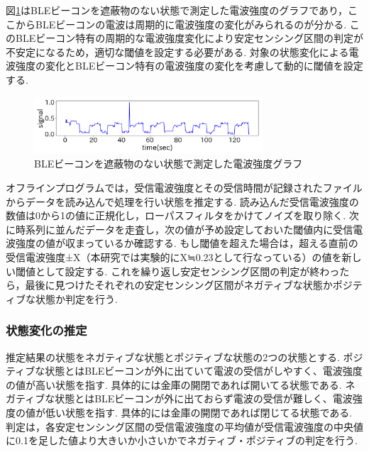 \documentclass[Japanese]{dicomopapers}
\begin{document}
図\ref{nomal-data}はBLEビーコンを遮蔽物のない状態で測定した電波強度のグラフであり，ここからBLEビーコンの電波は周期的に電波強度の変化がみられるのが分かる.
このBLEビーコン特有の周期的な電波強度変化により安定センシング区間の判定が不安定になるため，適切な閾値を設定する必要がある.
対象の状態変化による電波強度の変化とBLEビーコン特有の電波強度の変化を考慮して動的に閾値を設定する.


\begin{figure}[tbh]
    \centering
    \includegraphics[width=8.5cm]{bokoboko.png}
    \caption{BLEビーコンを遮蔽物のない状態で測定した電波強度グラフ}
    \label{nomal-data}
\end{figure}


オフラインプログラムでは，受信電波強度とその受信時間が記録されたファイルからデータを読み込んで処理を行い状態を推定する.
読み込んだ受信電波強度の数値は0から1の値に正規化し，ローパスフィルタをかけてノイズを取り除く.
次に時系列に並んだデータを走査し，次の値が予め設定しておいた閾値内に受信電波強度の値が収まっているか確認する.
もし閾値を超えた場合は，超える直前の受信電波強度±X（本研究では実験的にX≒0.23として行なっている）の値を新しい閾値として設定する.
これを繰り返し安定センシング区間の判定が終わったら，最後に見つけたそれぞれの安定センシング区間がネガティブな状態かポジティブな状態か判定を行う.





\subsubsection{状態変化の推定}
推定結果の状態をネガティブな状態とポジティブな状態の2つの状態とする.
ポジティブな状態とはBLEビーコンが外に出ていて電波の受信がしやすく、電波強度の値が高い状態を指す. 具体的には金庫の開閉であれば開いてる状態である.
ネガティブな状態とはBLEビーコンが外に出ておらず電波の受信が難しく、電波強度の値が低い状態を指す. 具体的には金庫の開閉であれば閉じてる状態である.
判定は，各安定センシング区間の受信電波強度の平均値が受信電波強度の中央値に0.1を足した値より大きいか小さいかでネガティブ・ポジティブの判定を行う.



\end{document}
